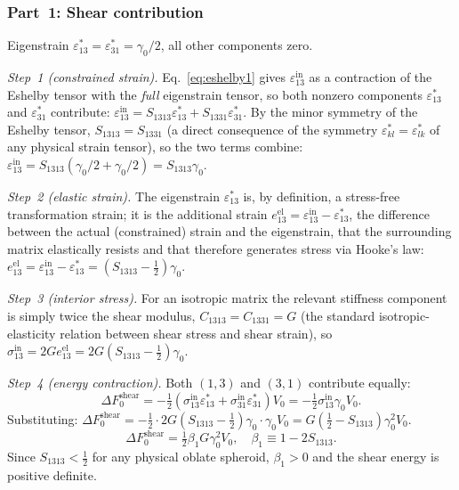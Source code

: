 \documentclass[5p,sort&compress]{elsarticle}
\newcommand{\dF}{\Delta F_0}
\newcommand{\gz}{\gamma_0}
\newcommand{\half}{\tfrac{1}{2}}
\begin{document}
\subsubsection{Part~1: Shear contribution}
\label{sec:Eshear}

Eigenstrain $\varepsilon^*_{13}=\varepsilon^*_{31}=\gz/2$, all other
components zero.

\textit{Step~1 (constrained strain).}
Eq.~\eqref{eq:eshelby1} gives $\varepsilon_{13}^\mathrm{in}$ as a
contraction of the Eshelby tensor with the \emph{full} eigenstrain
tensor, so both nonzero components $\varepsilon^*_{13}$ and
$\varepsilon^*_{31}$ contribute:
$\varepsilon_{13}^\mathrm{in}=S_{1313}\varepsilon^*_{13}+S_{1331}\varepsilon^*_{31}$.
By the minor symmetry of the Eshelby tensor, $S_{1313}=S_{1331}$ (a
direct consequence of the symmetry $\varepsilon^*_{kl}=\varepsilon^*_{lk}$
of any physical strain tensor), so the two terms combine:
$\varepsilon_{13}^\mathrm{in}=S_{1313}(\gz/2+\gz/2)=S_{1313}\gz$.

\textit{Step~2 (elastic strain).}
The eigenstrain $\varepsilon^*_{13}$ is, by definition, a stress-free
transformation strain; it is the additional strain
$e_{13}^\mathrm{el}=\varepsilon_{13}^\mathrm{in}-\varepsilon^*_{13}$,
the difference between the actual (constrained) strain and the
eigenstrain, that the surrounding matrix elastically resists and
that therefore generates stress via Hooke's law:
$e_{13}^\mathrm{el}=\varepsilon_{13}^\mathrm{in}-\varepsilon^*_{13}
=(S_{1313}-\half)\gz$.

\textit{Step~3 (interior stress).}
For an isotropic matrix the relevant stiffness component is simply
twice the shear modulus, $C_{1313}=C_{1331}=G$ (the standard
isotropic-elasticity relation between shear stress and shear strain),
so
$\sigma_{13}^\mathrm{in}=2Ge_{13}^\mathrm{el}
=2G(S_{1313}-\half)\gz$.

\textit{Step~4 (energy contraction).}
Both $(1,3)$ and $(3,1)$ contribute equally:
\[
  \dF^\text{shear}=-\half(\sigma_{13}^\mathrm{in}\varepsilon^*_{13}
  +\sigma_{31}^\mathrm{in}\varepsilon^*_{31})V_0
  =-\half\sigma_{13}^\mathrm{in}\gz V_0.
\]
Substituting:
$\dF^\text{shear}=-\half\cdot2G(S_{1313}-\half)\gz\cdot\gz V_0
=G(\half-S_{1313})\gz^2 V_0$.
\begin{equation}
  \boxed{\dF^\text{shear}=\half\beta_1 G\gz^2 V_0,\quad
  \beta_1\equiv1-2S_{1313}.}
  \label{eq:Eshear}
\end{equation}
Since $S_{1313}<\half$ for any physical oblate spheroid,
$\beta_1>0$ and the shear energy is positive definite.
\end{document}
